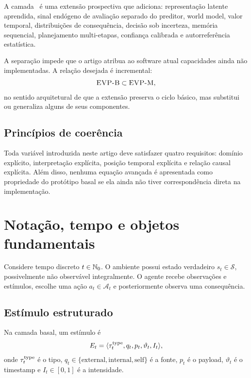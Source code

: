 \begin{definition}
A camada \EVPM\ é uma extensão prospectiva que adiciona: representação latente aprendida, sinal endógeno de avaliação separado do preditor, world model, valor temporal, distribuições de consequência, decisão sob incerteza, memória sequencial, planejamento multi-etapas, confiança calibrada e autorreferência estatística.
\end{definition}

A separação impede que o artigo atribua ao software atual capacidades ainda não implementadas. A relação desejada é incremental:
\[
\textsc{EVP-B} \subset \textsc{EVP-M},
\]
no sentido arquitetural de que a extensão preserva o ciclo básico, mas substitui ou generaliza alguns de seus componentes.

\subsection{Princípios de coerência}

Toda variável introduzida neste artigo deve satisfazer quatro requisitos: domínio explícito, interpretação explícita, posição temporal explícita e relação causal explícita. Além disso, nenhuma equação avançada é apresentada como propriedade do protótipo basal se ela ainda não tiver correspondência direta na implementação.

\section{Notação, tempo e objetos fundamentais}

Considere tempo discreto \(t\in\mathbb{N}_0\). O ambiente possui estado verdadeiro \(s_t\in\mathcal S\), possivelmente não observável integralmente. O agente recebe observações e estímulos, escolhe uma ação \(a_t\in\mathcal A_t\) e posteriormente observa uma consequência.

\subsection{Estímulo estruturado}

Na camada basal, um estímulo é
\begin{equation}
E_t=\langle \tau_t^{\rm type},q_t,p_t,\vartheta_t,I_t\rangle,
\label{eq:stimulus}
\end{equation}
onde \(\tau_t^{\rm type}\) é o tipo, \(q_t\in\{\text{external},\text{internal},\text{self}\}\) é a fonte, \(p_t\) é o payload, \(\vartheta_t\) é o timestamp e \(I_t\in[0,1]\) é a intensidade.

